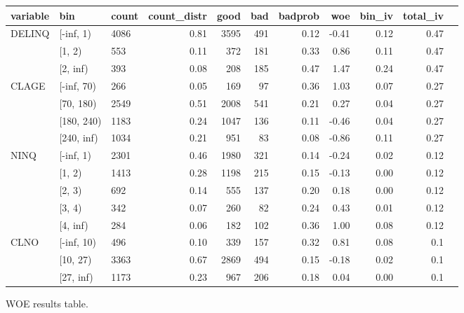 \begin{landscape}
	\begin{figure}[!ht]
		\centering
		\begin{tabular}{lllrrrrrrrr}
			\toprule
			variable & bin &  count &  count\_distr &  good &  bad &   badprob &       woe &    bin\_iv &  total\_iv \\
			\midrule
			  DELINQ &  [-inf, 1) &   4086 &         0.81 &  3595 &  491 &     0.12 & -0.41 &    0.12 &      0.47 \\
			   &   [1, 2) &    553 &         0.11 &   372 &  181 &     0.33 &  0.86 &    0.11 &      0.47  \\
			    &   [2, inf) &    393 &         0.08 &   208 &  185 &     0.47 &  1.47 &    0.24 &      0.47  \\
			\midrule
			     CLAGE &    [-inf, 70) &    266 &         0.05 &   169 &   97 &     0.36 &  1.03 &    0.07 &      0.27  \\
			     &   [70, 180) &   2549 &         0.51 &  2008 &  541 &     0.21 &  0.27 &    0.04 &      0.27  \\
			     &  [180, 240) &   1183 &         0.24 &  1047 &  136 &     0.11 & -0.46 &    0.04 &      0.27  \\
			     &    [240, inf) &   1034 &         0.21 &   951 &   83 &     0.08 & -0.86 &    0.11 &      0.27  \\
			\midrule
			    NINQ &  [-inf, 1) &   2301 &         0.46 &  1980 &  321 &     0.14 & -0.24 &    0.02 &      0.12      \\
			     &   [1, 2) &   1413 &         0.28 &  1198 &  215 &     0.15 & -0.13 &    0.00 &      0.12 \\
			     &   [2, 3) &    692 &         0.14 &   555 &  137 &     0.20 &  0.18 &    0.00 &      0.12  \\
			     &   [3, 4) &    342 &         0.07 &   260 &   82 &     0.24 &  0.43 &    0.01 &      0.12  \\
			     &   [4, inf) &    284 &         0.06 &   182 &  102 &     0.36 &  1.00 &    0.08 &      0.12  \\
			\midrule
			  CLNO &  [-inf, 10) &    496 &         0.10 &   339 &  157 &     0.32 &  0.81 &    0.08 &       0.1  \\
			      &  [10, 27) &   3363 &         0.67 &  2869 &  494 &     0.15 & -0.18 &    0.02 &       0.1  \\
			      &   [27, inf) &   1173 &         0.23 &   967 &  206 &     0.18 &  0.04 &    0.00 &       0.1 \\
			\bottomrule
		\end{tabular}
		\caption{WOE results table. \label{woe_2}}
	\end{figure}
\end{landscape}
